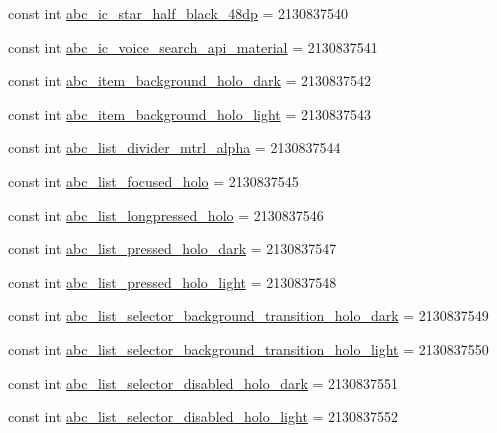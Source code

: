 \begin{CompactItemize}
\item 
const int \hyperlink{class__2doo_1_1_droid_1_1_resource_1_1_drawable_b9780acf1575027906312f0d274f2a33}{abc\_\-ic\_\-star\_\-half\_\-black\_\-48dp} = 2130837540
\item 
const int \hyperlink{class__2doo_1_1_droid_1_1_resource_1_1_drawable_b517d7e858b637a688931aefc1f7549b}{abc\_\-ic\_\-voice\_\-search\_\-api\_\-material} = 2130837541
\item 
const int \hyperlink{class__2doo_1_1_droid_1_1_resource_1_1_drawable_8ed38bcf001669bed1fbefbac4349dd8}{abc\_\-item\_\-background\_\-holo\_\-dark} = 2130837542
\item 
const int \hyperlink{class__2doo_1_1_droid_1_1_resource_1_1_drawable_8262b23a7c6f511d7af35987f57d2d6d}{abc\_\-item\_\-background\_\-holo\_\-light} = 2130837543
\item 
const int \hyperlink{class__2doo_1_1_droid_1_1_resource_1_1_drawable_193b5c99e23d2b8f9af12ef40f74cb80}{abc\_\-list\_\-divider\_\-mtrl\_\-alpha} = 2130837544
\item 
const int \hyperlink{class__2doo_1_1_droid_1_1_resource_1_1_drawable_fd23830d4ea3ecc2f34bb6ff59eaa413}{abc\_\-list\_\-focused\_\-holo} = 2130837545
\item 
const int \hyperlink{class__2doo_1_1_droid_1_1_resource_1_1_drawable_195972abb2e0d83f2c4931bf9b388ff0}{abc\_\-list\_\-longpressed\_\-holo} = 2130837546
\item 
const int \hyperlink{class__2doo_1_1_droid_1_1_resource_1_1_drawable_77fedd7ade627672c8864245e679a294}{abc\_\-list\_\-pressed\_\-holo\_\-dark} = 2130837547
\item 
const int \hyperlink{class__2doo_1_1_droid_1_1_resource_1_1_drawable_cc9713a255c41bb3debd4e2413ee85b5}{abc\_\-list\_\-pressed\_\-holo\_\-light} = 2130837548
\item 
const int \hyperlink{class__2doo_1_1_droid_1_1_resource_1_1_drawable_3a4eb41e771fd047c166a46fb54073c5}{abc\_\-list\_\-selector\_\-background\_\-transition\_\-holo\_\-dark} = 2130837549
\item 
const int \hyperlink{class__2doo_1_1_droid_1_1_resource_1_1_drawable_64d50cf66a8bf6d3d0e0ffbf0abe07b1}{abc\_\-list\_\-selector\_\-background\_\-transition\_\-holo\_\-light} = 2130837550
\item 
const int \hyperlink{class__2doo_1_1_droid_1_1_resource_1_1_drawable_cd4c21b9e9d026a79741cee18801ff52}{abc\_\-list\_\-selector\_\-disabled\_\-holo\_\-dark} = 2130837551
\item 
const int \hyperlink{class__2doo_1_1_droid_1_1_resource_1_1_drawable_74926eb91b3622ec9c7bb8d6629fd3c2}{abc\_\-list\_\-selector\_\-disabled\_\-holo\_\-light} = 2130837552

\end{CompactItemize}

